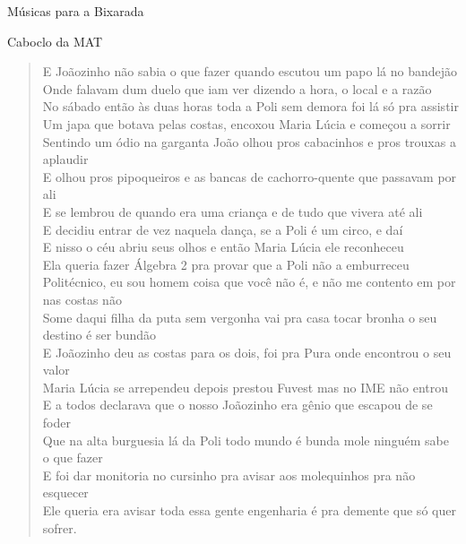 \begin{secao}{Músicas para a Bixarada}
\begin{subsecao}{Caboclo da MAT}
\begin{verse}
{E Joãozinho não sabia o que fazer quando escutou um papo lá no bandejão\\
Onde falavam dum duelo que iam ver dizendo a hora, o local e a razão\\
No sábado então às duas horas toda a Poli sem demora foi lá só pra assistir\\
Um japa que botava pelas costas, encoxou Maria Lúcia e começou a sorrir\\
Sentindo um ódio na garganta João olhou pros cabacinhos e pros trouxas a
aplaudir\\
E olhou pros pipoqueiros e as bancas de cachorro-quente que passavam por ali\\
E se lembrou de quando era uma criança e de tudo que vivera até ali\\
E decidiu entrar de vez naquela dança, se a Poli é um circo, e daí\\
E nisso o céu abriu seus olhos e então Maria Lúcia ele reconheceu\\
Ela queria fazer Álgebra 2 pra provar que a Poli não a emburreceu\\
Politécnico, eu sou homem coisa que você não é, e não me contento em por nas
costas não\\
Some daqui filha da puta sem vergonha vai pra casa tocar bronha o seu destino é
ser bundão\\
E Joãozinho deu as costas para os dois, foi pra Pura onde encontrou o seu valor\\
Maria Lúcia se arrependeu depois prestou Fuvest mas no IME não entrou\\
E a todos declarava que o nosso Joãozinho era gênio que escapou de se foder\\
Que na alta burguesia lá da Poli todo mundo é bunda mole ninguém sabe o que
fazer\\
E foi dar monitoria no cursinho pra avisar aos molequinhos pra não esquecer\\
Ele queria era avisar toda essa gente engenharia é pra demente que só quer
sofrer.\\
}
\end{verse}
\end{subsecao}

\end{secao}
